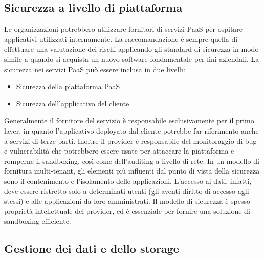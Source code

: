 \subsection{Sicurezza a livello di piattaforma}
Le organizzazioni potrebbero utilizzare fornitori di servizi PaaS per ospitare applicativi utilizzati internamente.
La raccomandazione è sempre quella di effettuare una valutazione dei rischi applicando gli standard di sicurezza in modo simile a quando si acquista un nuovo software fondamentale per fini aziendali.
La sicurezza nei servizi PaaS può essere inclusa in due livelli:
\begin{itemize}
\item Sicurezza della piattaforma PaaS
\item Sicurezza dell'applicativo del cliente
\end{itemize}
Generalmente il fornitore del servizio è responsabile esclusivamente per il primo layer, in quanto l'applicativo deployato dal cliente potrebbe far riferimento anche a servizi di terze parti.
Inoltre il provider è responsabile del monitoraggio di bug e vulnerabilità che potrebbero essere usate per attaccare la piattaforma e romperne il sandboxing, così come dell'auditing a livello di rete.
In un modello di fornitura multi-tenant, gli elementi più influenti dal punto di vista della sicurezza sono il contenimento e l'isolamento delle applicazioni.\cite{CloudSecurityBook}
L'accesso ai dati, infatti, deve essere ristretto solo a determinati utenti (gli aventi diritto di accesso agli stessi) e alle applicazioni da loro amministrati. Il modello di sicurezza è spesso proprietà intellettuale del provider, ed è essenziale per fornire una soluzione di sandboxing efficiente.

\subsection{Gestione dei dati e dello storage}

